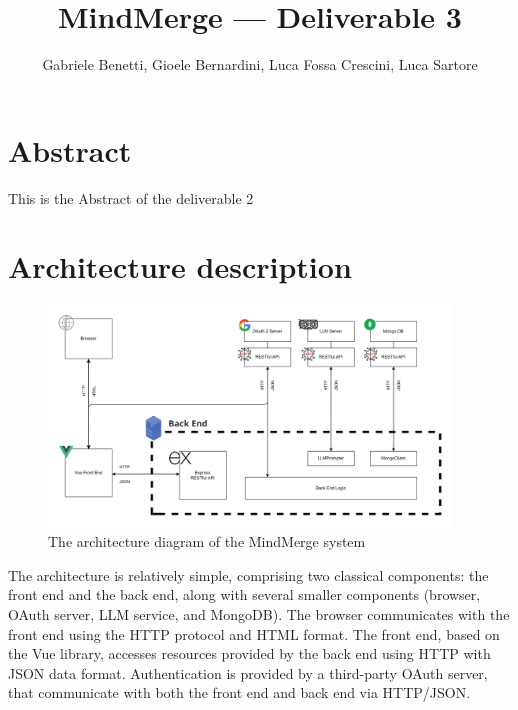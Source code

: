 \documentclass{article}
\title{MindMerge --- Deliverable 3}
\author{Gabriele Benetti, Gioele Bernardini, Luca Fossa Crescini, Luca Sartore}
\begin{document}
\maketitle


\tableofcontents


\newpage
\section*{Abstract}   %
This is the Abstract of the deliverable 2

\section{Architecture description}


\begin{figure}[h]
  \centering
  \includegraphics[width=0.95\textwidth]{images/architecture.jpg}
  \caption{\small The architecture diagram of the MindMerge system}
\end{figure}
The architecture is relatively simple,
comprising two classical components: the front end and the back end, along with several smaller components (browser, OAuth server, LLM service, and MongoDB).
\newline \newline
The browser communicates with the front end using the HTTP protocol and HTML format.
\newline \newline
The front end, based on the Vue library, accesses resources provided by the back end using HTTP with JSON data format.
\newline \newline
Authentication is provided by a third-party OAuth server, that communicate with both the front end and back end via HTTP/JSON.
\newline \newline
\end{document}
